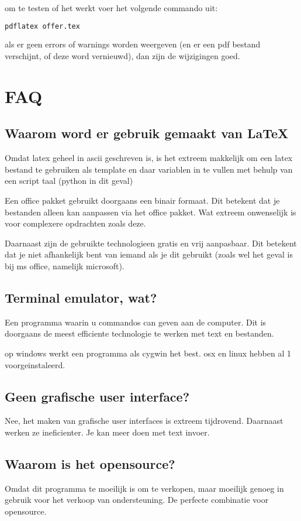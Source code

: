 \documentclass{scrartcl}
\begin{document}
om te testen of het werkt voer het volgende commando uit:

\begin{lstlisting}[language=bash]
	pdflatex offer.tex
\end{lstlisting}

als er geen errors of warnings worden weergeven (en er een pdf bestand
verschijnt, of deze word vernieuwd), dan zijn de wijzigingen goed.

\section{FAQ}
\subsection{Waarom word er gebruik gemaakt van \LaTeX}
Omdat latex geheel in ascii geschreven is, is het extreem makkelijk
om een latex bestand te gebruiken als template en daar variablen in
te vullen met behulp van een script taal (python in dit geval)

Een office pakket gebruikt doorgaans een binair formaat. Dit betekent
dat je bestanden alleen kan aanpassen via het office pakket. Wat
extreem onwenselijk is voor complexere opdrachten zoals deze.

Daarnaast zijn de gebruikte technologieen gratis en vrij aanpasbaar.
Dit betekent dat je niet afhankelijk bent van iemand als je dit
gebruikt (zoals wel het geval is bij ms office, namelijk microsoft).

\subsection{Terminal emulator, wat?}
Een programma waarin u commandos can geven aan de computer. Dit is
doorgaans de meest efficiente technologie te werken met text en bestanden.

op windows werkt een programma als cygwin het best. osx en linux hebben
al 1 voorgeinstaleerd.

\subsection{Geen grafische user interface?}
Nee, het maken van grafische user interfaces is extreem tijdrovend.
Daarnaast werken ze ineficienter. Je kan meer doen met text invoer.
\subsection{Waarom is het opensource?}
Omdat dit programma te moeilijk is om te verkopen, maar moeilijk
genoeg in gebruik voor het verkoop van ondersteuning. De perfecte
combinatie voor opensource.
\end{document}

